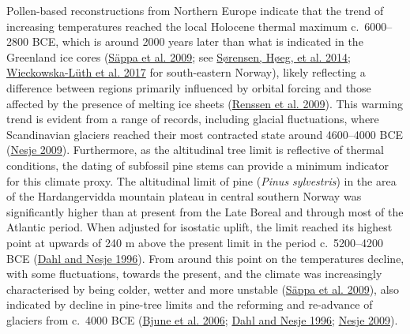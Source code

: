 \documentclass[
  12pt,
  a4paper,
  oneside]{book}
\begin{document}
Pollen-based reconstructions from Northern Europe indicate that the trend of increasing temperatures reached the local Holocene thermal maximum c.~6000--2800 BCE, which is around 2000 years later than what is indicated in the Greenland ice cores (\protect\hyperlink{ref-seppa2009}{Säppa et al. 2009}; see \protect\hyperlink{ref-suxf8rensen2014b}{Sørensen, Høeg, et al. 2014}; \protect\hyperlink{ref-wieckowska-luth2017}{Wieckowska-Lüth et al. 2017} for south-eastern Norway), likely reflecting a difference between regions primarily influenced by orbital forcing and those affected by the presence of melting ice sheets (\protect\hyperlink{ref-renssen2009}{Renssen et al. 2009}). This warming trend is evident from a range of records, including glacial fluctuations, where Scandinavian glaciers reached their most contracted state around 4600--4000 BCE (\protect\hyperlink{ref-nesje2009}{Nesje 2009}). Furthermore, as the altitudinal tree limit is reflective of thermal conditions, the dating of subfossil pine stems can provide a minimum indicator for this climate proxy. The altitudinal limit of pine (\emph{Pinus sylvestris}) in the area of the Hardangervidda mountain plateau in central southern Norway was significantly higher than at present from the Late Boreal and through most of the Atlantic period. When adjusted for isostatic uplift, the limit reached its highest point at upwards of 240 m above the present limit in the period c.~5200--4200 BCE (\protect\hyperlink{ref-dahl1996}{Dahl and Nesje 1996}). From around this point on the temperatures decline, with some fluctuations, towards the present, and the climate was increasingly characterised by being colder, wetter and more unstable (\protect\hyperlink{ref-seppa2009}{Säppa et al. 2009}), also indicated by decline in pine-tree limits and the reforming and re-advance of glaciers from c.~4000 BCE (\protect\hyperlink{ref-bjune2006}{Bjune et al. 2006}; \protect\hyperlink{ref-dahl1996}{Dahl and Nesje 1996}; \protect\hyperlink{ref-nesje2009}{Nesje 2009}).
\end{document}
